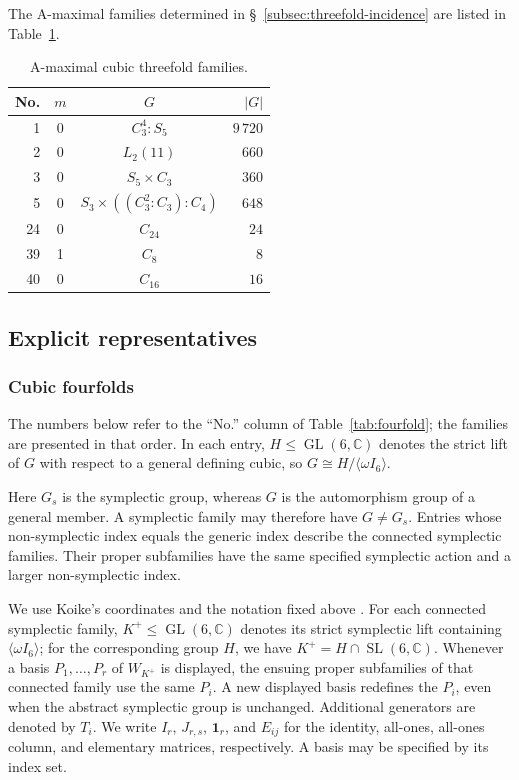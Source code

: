 \documentclass[12pt]{amsart}
\numberwithin{equation}{section}
\theoremstyle{plain}
\theoremstyle{definition}
\theoremstyle{remark}
\newcommand{\CC}{\mathbb C}
\DeclareMathOperator{\GL}{GL}
\DeclareMathOperator{\SL}{SL}
\begin{document}
The A-maximal families determined in
\S~\ref{subsec:threefold-incidence} are listed in
Table~\ref{tab:threefold-action-maximal}.

\begin{table}[htbp]
\centering
\caption{A-maximal cubic threefold families.}
\label{tab:threefold-action-maximal}
\begin{tabular}{@{}rccr@{}}
\toprule
No. & $m$ & $G$ & $|G|$ \\
\midrule
1 & 0 & $C_3^4:S_5$                           & $9\,720$ \\
2 & 0 & $L_2(11)$                             & $660$ \\
3 & 0 & $S_5\times C_3$                      & $360$ \\
5 & 0 & $S_3\times((C_3^2:C_3):C_4)$         & $648$ \\
24 & 0 & $C_{24}$                              & $24$ \\
39 & 1 & $C_8$                                 & $8$ \\
40 & 0 & $C_{16}$                              & $16$ \\
\bottomrule
\end{tabular}
\end{table}

\FloatBarrier

\subsection{Explicit representatives}

\subsubsection{Cubic fourfolds}
\label{subsubsection: description for fourfolds}

The numbers below refer to the ``No.'' column of
Table~\ref{tab:fourfold}; the families are presented in that order.
In each entry, $H\leq\GL(6,\CC)$ denotes the strict lift of $G$
with respect to a general defining cubic, so
$G\cong H/\langle\omega I_6\rangle$.

Here $G_s$ is the symplectic group, whereas $G$ is the automorphism
group of a general member.  A symplectic family may therefore have
$G\ne G_s$.  Entries whose non-symplectic index equals the generic index
describe the connected symplectic families.  Their proper subfamilies have the same specified
symplectic action and a larger non-symplectic index.

We use Koike's coordinates and the notation fixed above \cite{KOIKE202512,KOIKE2026}.
For each connected symplectic family, $K^+\leq\GL(6,\CC)$ denotes its
strict symplectic lift containing $\langle\omega I_6\rangle$; for the
corresponding group $H$, we have $K^+=H\cap\SL(6,\CC)$. Whenever a basis
$P_1,\ldots,P_r$ of $W_{K^+}$ is displayed, the ensuing proper subfamilies
of that connected family use the same $P_i$. A new displayed basis redefines
the $P_i$, even when the abstract symplectic group is unchanged.
Additional generators are denoted by $T_i$. We write $I_r$,
$J_{r,s}$, $\mathbf 1_r$, and $E_{ij}$ for the identity, all-ones,
all-ones column, and elementary matrices, respectively. A basis may be
specified by its index set.
\end{document}
